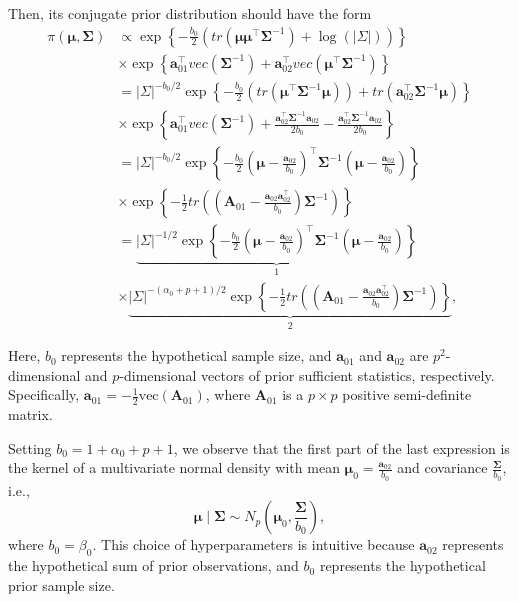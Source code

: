 \begin{enumerate}
Then, its conjugate prior distribution should have the form
\begin{align}
	\pi(\bm{\mu},\bm{\Sigma})&\propto \exp\left\{-\frac{b_0}{2}\left(tr\left(\bm{\mu}\bm{\mu}^{\top}\bm{\Sigma}^{-1}\right)+\log(|\Sigma|)\right)\right\}\nonumber\\
	&\times \exp\left\{\bm{a}_{01}^{\top} vec\left(\bm{\Sigma}^{-1}\right)+\bm{a}_{02}^{\top}vec\left(\bm{\mu}^{\top}\bm{\Sigma}^{-1}\right)\right\}\nonumber\\
	&=|\Sigma|^{-b_0/2}\exp\left\{-\frac{b_0}{2}\left(tr\left(\bm{\mu}^{\top}\bm{\Sigma}^{-1}\bm{\mu}\right)\right)+tr\left(\bm{a}_{02}^{\top}\bm{\Sigma}^{-1}\bm{\mu}\right)\right\}\nonumber\\
	&\times \exp\left\{\bm{a}_{01}^{\top} vec\left(\bm{\Sigma}^{-1}\right)+\frac{\bm{a}_{02}^{\top}\bm{\Sigma}^{-1}\bm{a}_{02}}{2b_0}-\frac{\bm{a}_{02}^{\top}\bm{\Sigma}^{-1}\bm{a}_{02}}{2b_0}\right\}\nonumber\\
	&=|\Sigma|^{-b_0/2}\exp\left\{-\frac{b_0}{2}\left(\bm{\mu}-\frac{\bm{a}_{02}}{b_0}\right)^{\top}\bm{\Sigma}^{-1}\left(\bm{\mu}-\frac{\bm{a}_{02}}{b_0}\right)\right\}\nonumber\\
	&\times \exp\left\{-\frac{1}{2}tr\left(\left(\bm{A}_{01}-\frac{\bm{a}_{02}\bm{a}_{02}^{\top}}{b_0}\right)\bm{\Sigma}^{-1}\right)\right\}\nonumber\\
	&=\underbrace{|\Sigma|^{-1/2}\exp\left\{-\frac{b_0}{2}\left(\bm{\mu}-\frac{\bm{a}_{02}}{b_0}\right)^{\top}\bm{\Sigma}^{-1}\left(\bm{\mu}-\frac{\bm{a}_{02}}{b_0}\right)\right\}}_1\nonumber\\
	&\times \underbrace{|\Sigma|^{-(\alpha_0+p+1)/2}\exp\left\{-\frac{1}{2}tr\left(\left(\bm{A}_{01}-\frac{\bm{a}_{02}\bm{a}_{02}^{\top}}{b_0}\right)\bm{\Sigma}^{-1}\right)\right\}}_2,\nonumber
\end{align}

Here, \( b_0 \) represents the hypothetical sample size, and \( \bm{a}_{01} \) and \( \bm{a}_{02} \) are \( p^2 \)-dimensional and \( p \)-dimensional vectors of prior sufficient statistics, respectively. Specifically, \( \bm{a}_{01} = -\frac{1}{2} \text{vec}(\bm{A}_{01}) \), where \( \bm{A}_{01} \) is a \( p \times p \) positive semi-definite matrix. 

Setting \( b_0 = 1 + \alpha_0 + p + 1 \), we observe that the first part of the last expression is the kernel of a multivariate normal density with mean \( \bm{\mu}_0 = \frac{\bm{a}_{02}}{b_0} \) and covariance \( \frac{\bm{\Sigma}}{b_0} \), i.e.,
\[
\bm{\mu} \mid \bm{\Sigma} \sim N_p \left( \bm{\mu}_0, \frac{\bm{\Sigma}}{b_0} \right),
\]
where \( b_0 = \beta_0 \). This choice of hyperparameters is intuitive because \( \bm{a}_{02} \) represents the hypothetical sum of prior observations, and \( b_0 \) represents the hypothetical prior sample size.


\end{enumerate}
